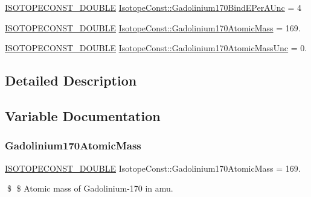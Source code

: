 \begin{DoxyCompactItemize}
\mbox{\hyperlink{group___isotope_const-_macros_ga8f45a7272ce02c0b4c65c44636ed719a}{I\+S\+O\+T\+O\+P\+E\+C\+O\+N\+S\+T\+\_\+\+D\+O\+U\+B\+LE}} \mbox{\hyperlink{group___isotope_const-_gadolinium-_gd170_ga272d820ba6b96e75cbf51b8c0a7cece4}{Isotope\+Const\+::\+Gadolinium170\+Bind\+E\+Per\+A\+Unc}} = 4
\item 
\mbox{\hyperlink{group___isotope_const-_macros_ga8f45a7272ce02c0b4c65c44636ed719a}{I\+S\+O\+T\+O\+P\+E\+C\+O\+N\+S\+T\+\_\+\+D\+O\+U\+B\+LE}} \mbox{\hyperlink{group___isotope_const-_gadolinium-_gd170_ga4b536d503bdeccb600415ce373a23766}{Isotope\+Const\+::\+Gadolinium170\+Atomic\+Mass}} = 169.
\item 
\mbox{\hyperlink{group___isotope_const-_macros_ga8f45a7272ce02c0b4c65c44636ed719a}{I\+S\+O\+T\+O\+P\+E\+C\+O\+N\+S\+T\+\_\+\+D\+O\+U\+B\+LE}} \mbox{\hyperlink{group___isotope_const-_gadolinium-_gd170_ga96796d083eaaee40a81e640d6b97ab0c}{Isotope\+Const\+::\+Gadolinium170\+Atomic\+Mass\+Unc}} = 0.
\end{DoxyCompactItemize}


\subsection{Detailed Description}


\subsection{Variable Documentation}
\mbox{\label{group___isotope_const-_gadolinium-_gd170_ga4b536d503bdeccb600415ce373a23766}} 
\subsubsection{\texorpdfstring{Gadolinium170\+Atomic\+Mass}{Gadolinium170AtomicMass}}
{\footnotesize\ttfamily \mbox{\hyperlink{group___isotope_const-_macros_ga8f45a7272ce02c0b4c65c44636ed719a}{I\+S\+O\+T\+O\+P\+E\+C\+O\+N\+S\+T\+\_\+\+D\+O\+U\+B\+LE}} Isotope\+Const\+::\+Gadolinium170\+Atomic\+Mass = 169.}

\$ \$ Atomic mass of Gadolinium-\/170 in amu. \mbox{\label{group___isotope_const-_gadolinium-_gd170_ga96796d083eaaee40a81e640d6b97ab0c}} 
